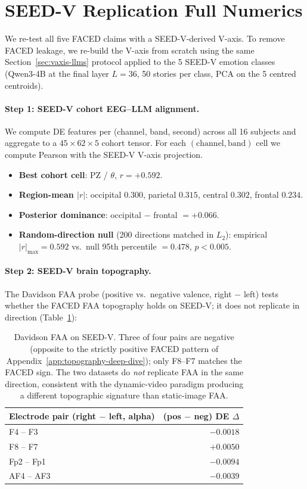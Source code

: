 \section{SEED-V Replication Full Numerics}
\label{app:seedv-full}

We re-test all five FACED claims with a SEED-V-derived V-axis. To
remove FACED leakage, we re-build the V-axis from scratch using the
same Section~\ref{sec:vaxis-llms} protocol applied to the 5 SEED-V
emotion classes (Qwen3-4B at the final layer $L{=}36$, 50 stories per
class, PCA on the 5 centred centroids).

\paragraph{Step 1: SEED-V cohort EEG--LLM alignment.}
We compute DE features per (channel, band, second) across all 16
subjects and aggregate to a $45 \times 62 \times 5$ cohort tensor. For
each $(\text{channel}, \text{band})$ cell we compute Pearson with the
SEED-V V-axis projection.

\begin{itemize}
\item \textbf{Best cohort cell}: PZ / $\theta$, $r=+0.592$.
\item \textbf{Region-mean $|r|$}: occipital $0.300$, parietal $0.315$,
central $0.302$, frontal $0.234$.
\item \textbf{Posterior dominance}: occipital $-$ frontal $= +0.066$.
\item \textbf{Random-direction null} (200 directions matched in $L_2$):
empirical $|r|_{\max}=0.592$ vs.\ null 95th percentile $=0.478$,
$p<0.005$.
\end{itemize}

\paragraph{Step 2: SEED-V brain topography.}
The Davidson FAA probe (positive vs.\ negative valence, right $-$ left)
tests whether the FACED FAA topography holds on SEED-V; it does not
replicate in direction (Table~\ref{tab:seedv-faa}):

\begin{table}[h]
\centering
\small
\begin{tabular}{lr}
\toprule
Electrode pair (right $-$ left, alpha) & (pos $-$ neg) DE $\Delta$ \\
\midrule
F4 -- F3   & $-0.0018$ \\
F8 -- F7   & $+0.0050$ \\
Fp2 -- Fp1 & $-0.0094$ \\
AF4 -- AF3 & $-0.0039$ \\
\bottomrule
\end{tabular}
\caption{Davidson FAA on SEED-V. Three of four pairs are negative
(opposite to the strictly positive FACED pattern of
Appendix~\ref{app:topography-deep-dive}); only F8--F7 matches the
FACED sign. The two datasets do \emph{not} replicate FAA in the
same direction, consistent with the dynamic-video paradigm
producing a different topographic signature than static-image FAA.}
\label{tab:seedv-faa}
\end{table}


